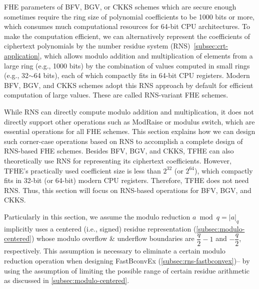 FHE parameters of BFV, BGV, or CKKS schemes which are secure enough sometimes require the ring size of polynomial coefficients to be 1000 bits or more, which consumes much computational resources for 64-bit CPU architectures. To make the computation efficient, we can alternatively represent the coefficients of ciphertext polynomials by the number residue system (RNS)~\autoref{subsec:crt-application}, which allows modulo addition and multiplication of elements from a large ring (e.g., 1000 bits) by the combination of values computed in small rings (e.g., 32$\sim$64 bits), each of which compactly fits in 64-bit CPU registers. Modern BFV, BGV, and CKKS schemes adopt this RNS approach by default for efficient computation of large values. These are called RNS-variant FHE schemes.  

While RNS can directly compute modulo addition and multiplication, it does not directly support other operations such as \textsf{ModRaise} or modulus switch, which are essential operations for all FHE schemes. This section explains how we can design such corner-case operations based on RNS to accomplish a complete design of RNS-based FHE schemes. Besides BFV, BGV, and CKKS, TFHE can also theoretically use RNS for representing its ciphertext coefficients. However, TFHE's practically used coefficient size is less than $2^{32}$ (or $2^{64}$), which compactly fits in 32-bit (or 64-bit) modern CPU registers. Therefore, TFHE does not need RNS. Thus, this section will focus on RNS-based operations for BFV, BGV, and CKKS. 

Particularly in this section, we assume the modulo reduction $a \bmod q = |a|_q$ implicitly uses a centered (i.e., signed) residue representation (\autoref{subsec:modulo-centered}) whose modulo overflow \& underflow boundaries are $\dfrac{q}{2} - 1$ and $-\dfrac{q}{2}$, respectively. This assumption is necessary to eliminate a certain modulo reduction operation when designing \textsf{FastBconvEx} (\autoref{subsec:rns-fastbconvex})-- by using the assumption of limiting the possible range of certain residue arithmetic as discussed in \autoref{subsec:modulo-centered}. 

